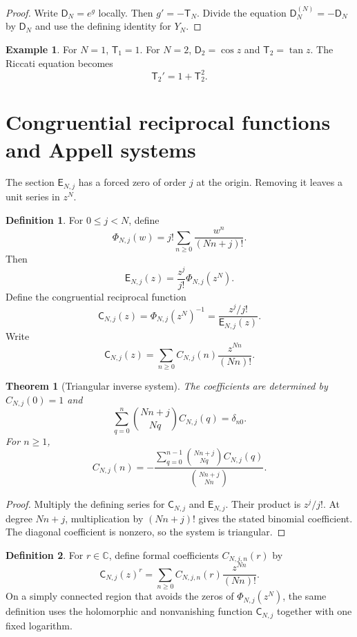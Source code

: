 \documentclass{aomart}
\newtheorem{theorem}{Theorem}[section]
\theoremstyle{definition}
\newtheorem{definition}[definition]{Definition}
\newtheorem{example}[example]{Example}
\theoremstyle{remark}
\newcommand{\CC}{\mathbb C}
\newcommand{\Dfun}{\mathsf D}
\newcommand{\Efun}{\mathsf E}
\newcommand{\Tfun}{\mathsf T}
\newcommand{\Cfun}{\mathsf C}
\begin{document}
\begin{proof}
Write $\Dfun_N=e^g$ locally.  Then $g'=-\Tfun_N$.  Divide the equation $\Dfun_N^{(N)}=-\Dfun_N$ by $\Dfun_N$ and use the defining identity for $Y_N$.
\end{proof}

\begin{example}\label{ex:ordinary_tangent}
For $N=1$, $\Tfun_1=1$.  For $N=2$, $\Dfun_2=\cos z$ and $\Tfun_2=\tan z$.  The Riccati equation becomes
\[
\Tfun_2'=1+\Tfun_2^2.
\]
\end{example}

\section{Congruential reciprocal functions and Appell systems}\label{sec:congruential}

The section $\Efun_{N,j}$ has a forced zero of order $j$ at the origin.  Removing it leaves a unit series in $z^N$.

\begin{definition}\label{def:normalized_section}
For $0\leq j<N$, define
\[
\Phi_{N,j}(w)
=
j!\sum_{n\geq0}\frac{w^n}{(Nn+j)!}.
\]
Then
\[
\Efun_{N,j}(z)
=
\frac{z^j}{j!}\Phi_{N,j}(z^N).
\]
Define the congruential reciprocal function
\[
\Cfun_{N,j}(z)
=
\Phi_{N,j}(z^N)^{-1}
=
\frac{z^j/j!}{\Efun_{N,j}(z)}.
\]
Write
\[
\Cfun_{N,j}(z)
=
\sum_{n\geq0}C_{N,j}(n)\frac{z^{Nn}}{(Nn)!}.
\]
\end{definition}

\begin{theorem}[Triangular inverse system]\label{thm:triangular_inverse}
The coefficients are determined by $C_{N,j}(0)=1$ and
\[
\sum_{q=0}^{n}
\binom{Nn+j}{Nq}
C_{N,j}(q)
=
\delta_{n0}.
\]
For $n\geq1$,
\[
C_{N,j}(n)
=
-
\frac{
\displaystyle\sum_{q=0}^{n-1}
\binom{Nn+j}{Nq}C_{N,j}(q)
}{
\displaystyle\binom{Nn+j}{Nn}
}.
\]
\end{theorem}

\begin{proof}
Multiply the defining series for $\Cfun_{N,j}$ and $\Efun_{N,j}$.  Their product is $z^j/j!$.  At degree $Nn+j$, multiplication by $(Nn+j)!$ gives the stated binomial coefficient.  The diagonal coefficient is nonzero, so the system is triangular.
\end{proof}

\begin{definition}\label{def:congruential_power}
For $r\in\CC$, define formal coefficients $C_{N,j,n}(r)$ by
\[
\Cfun_{N,j}(z)^r
=
\sum_{n\geq0}C_{N,j,n}(r)\frac{z^{Nn}}{(Nn)!}.
\]
On a simply connected region that avoids the zeros of $\Phi_{N,j}(z^N)$, the same definition uses the holomorphic and nonvanishing function $\Cfun_{N,j}$ together with one fixed logarithm.
\end{definition}
\end{document}
